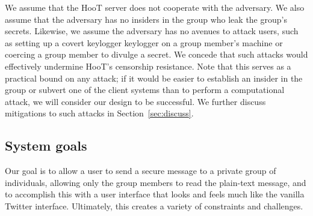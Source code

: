 We assume that the HooT server does not cooperate with the adversary. We
also assume that the adversary has no insiders in the group who leak the
group's secrets. Likewise, we assume the adversary has no avenues
to attack users, such as setting up a covert keylogger
keylogger on a group member's machine or coercing a group
member to divulge a secret. We concede that such attacks would effectively undermine HooT's censorship
resistance. Note that this serves as a practical bound on any attack; if
it would be easier to establish an insider in the group or subvert one
of the client systems than to perform a computational attack, we will
consider our design to be successful.
We further discuss mitigations to such attacks in Section~\ref{sec:discuss}.

\subsection{System goals} \label{sec:goals}
Our goal is to allow a user to send a secure message to a private group
of individuals, allowing only the group members to read the plain-text
message, and to accomplish this with a user interface that looks and
feels much like the vanilla Twitter interface. Ultimately, this creates
a variety of constraints and challenges.


